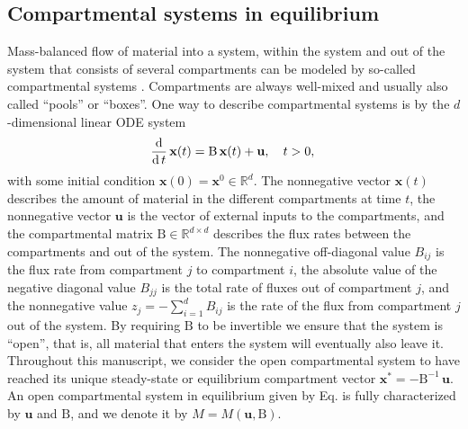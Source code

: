 \documentclass[smallextended]{svjour3}
\makeatletter
\renewcommand*{\eqref}[1]{%
  \hyperref[{#1}]{\textup{\tagform@{\ref*{#1}}}}%
}
\renewcommand{\tens}[1]{\mathrm{#1}}
\renewcommand{\vec}[1]{\mathbf{#1}}
\newcommand{\R}{\mathbb{R}}
\newcommand{\deriv}[1]{\frac{\operatorname{d}}{\operatorname{d}#1}}
\newcommand{\ie}{that is}
\renewcommand{\emph}[1]{``#1''}
\makeatother
\begin{document}
\subsection{Compartmental systems in equilibrium}\label{sec:one_particle}
Mass-balanced flow of material into a system, within the system and out of the system that consists of several compartments can be modeled by so-called compartmental systems \citep{Anderson1983, Jacquez1993SIAM}.
Compartments are always well-mixed and usually also called \emph{pools} or \emph{boxes}.
One way to describe compartmental systems is by the $d$-dimensional linear ODE system
\begin{equation}\label{eqn:lin_CS_sys}
  \deriv{t}\,\vec{x}(t) = \tens{B}\,\vec{x}(t) + \vec{u},\quad t>0,\\
\end{equation}
with some initial condition $\vec{x}(0) = \vec{x}^0\in\R^d$.
The nonnegative vector $\vec{x}(t)$ describes the amount of material in the different compartments at time $t$, the nonnegative vector $\vec{u}$ is the vector of external inputs to the compartments, and the compartmental matrix $\tens{B}\in\R^{d\times d}$ describes the flux rates between the compartments and out of the system.
The nonnegative off-diagonal value $B_{ij}$ is the flux rate from compartment $j$ to compartment $i$, the absolute value of the negative diagonal value $B_{jj}$ is the total rate of fluxes out of compartment $j$, and the nonnegative value $z_j=-\sum_{i=1}^d B_{ij}$ is the rate of the flux from compartment $j$ out of the system.
By requiring $\tens{B}$ to be invertible we ensure that the system is \emph{open}, \ie, all material that enters the system will eventually also leave it.
Throughout this manuscript, we consider the open compartmental system \eqref{eqn:lin_CS_sys} to have reached its unique steady-state or equilibrium compartment vector $\vec{x}^\ast = -\tens{B}^{-1}\,\vec{u}$.
An open compartmental system in equilibrium given by Eq.\eqref{eqn:lin_CS_sys} is fully characterized by $\vec{u}$ and $\tens{B}$, and we denote it by $M=M(\vec{u},\tens{B})$.
\end{document}

